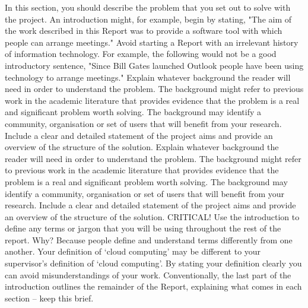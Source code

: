 In this section, you should describe the problem that you set out to solve with the project. An introduction might, for example, begin by stating, "The aim of the work described in this Report was to provide a software tool with which people can arrange meetings." Avoid starting a Report with an irrelevant history of information technology. For example, the following would not be a good introductory sentence, "Since Bill Gates launched Outlook people have been using technology to arrange meetings."
Explain whatever background the reader will need in order to understand the problem. The background might refer to previous work in the academic literature that provides evidence that the problem is a real and significant problem worth solving. The background may identify a community, organisation or set of users that will benefit from your research. Include a clear and detailed statement of the project aims and provide an overview of the structure of the solution.
Explain whatever background the reader will need in order to understand the problem. The background might refer to previous work in the academic literature that provides evidence that the problem is a real and significant problem worth solving. The background may identify a community, organisation or set of users that will benefit from your research. Include a clear and detailed statement of the project aims and provide an overview of the structure of the solution.
CRITICAL! Use the introduction to define any terms or jargon that you will be using throughout the rest of the report.  Why?  Because people define and understand terms differently from one another.  Your definition of ‘cloud computing’ may be different to your supervisor’s definition of ‘cloud computing’.  By stating your definition clearly you can avoid misunderstandings of your work.
Conventionally, the last part of the introduction outlines the remainder of the Report, explaining what comes in each section – keep this brief.